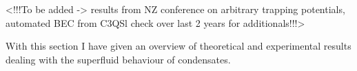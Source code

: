 
<!!!To be added -> results from NZ conference on arbitrary trapping potentials, automated BEC from C3QSl check over last 2 years for additionals!!!>

With this section I have given an overview of theoretical and experimental results dealing with the superfluid behaviour of condensates.
